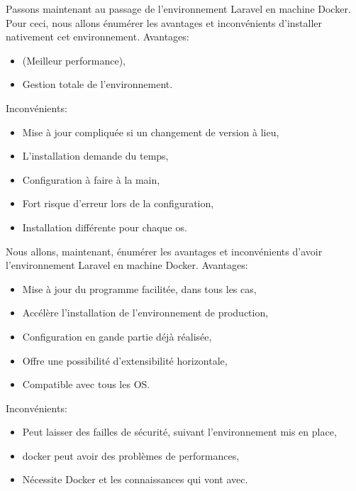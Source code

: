 \documentclass[
    iai, %
    il, %
]{heig-tb}
\begin{document}
Passons maintenant au passage de l'environnement Laravel en machine Docker.
Pour ceci, nous allons énumérer les avantages et inconvénients d'installer nativement cet environnement.
Avantages:
\begin{itemize}
    \item (Meilleur performance),
    \item Gestion totale de l'environnement.
\end{itemize}

Inconvénients:
\begin{itemize}
    \item Mise à jour compliquée si un changement de version à lieu,
    \item L'installation demande du temps,
    \item Configuration à faire à la main,
    \item Fort risque d'erreur lors de la configuration,
    \item Installation différente pour chaque \Gls{os}.
\end{itemize}

Nous allons, maintenant, énumérer les avantages et inconvénients d'avoir l'environnement Laravel en machine Docker.
Avantages:
\begin{itemize}
    \item Mise à jour du programme facilitée, dans tous les cas,
    \item Accélère l'installation de l'environnement de production,
    \item Configuration en gande partie déjà réalisée,
    \item Offre une possibilité d'extensibilité horizontale,
    \item Compatible avec tous les OS.
\end{itemize}

Inconvénients:
\begin{itemize}
    \item Peut laisser des failles de sécurité, suivant l'environnement mis en place,
    \item \Gls{docker} peut avoir des problèmes de performances, \cite{labrecque}
    \item Nécessite Docker et les connaissances qui vont avec. \cite{labrecque}
\end{itemize}

\end{document}
